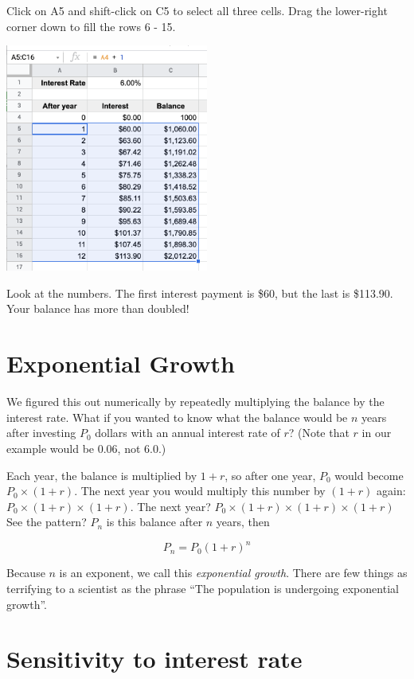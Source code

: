 Click on A5 and shift-click on C5 to select all three cells. Drag the
lower-right corner down to fill the rows 6 - 15.

\includegraphics[width=0.5\textwidth]{CopiedCellsInterest.png}

Look at the numbers.  The first interest payment is \$60, but the last
is \$113.90. Your balance has more than doubled!

\section{Exponential Growth}

We figured this out numerically by repeatedly multiplying the balance
by the interest rate. What if you wanted to know what the balance
would be $n$ years after investing $P_0$ dollars with an annual interest
rate of $r$? (Note that $r$ in our example would be 0.06, not 6.0.)

Each year, the balance is multiplied by $1 + r$, so after one year,
$P_0$ would become $P_0 \times (1 + r)$.  The next year you would multiply
this number by $(1 + r)$ again: $P_0 \times (1 + r) \times (1 + r)$. The
next year? $P_0 \times (1 + r) \times (1 + r) \times (1 + r)$ See the
pattern? $P_n$ is this balance after $n$ years, then

$$P_n = P_0 (1+r)^n$$

Because $n$ is an exponent, we call this \textit{exponential growth}.
There are few things as terrifying to a scientist as
the phrase ``The population is undergoing exponential growth''.

\section{Sensitivity to interest rate}

